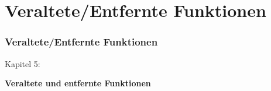 %

\section{Veraltete/Entfernte Funktionen}
\begin{frame}[fragile]
	\frametitle{Veraltete/Entfernte Funktionen}

	\begin{center}\huge{Kapitel 5:}\end{center}
	\begin{center}\huge{\color{typo3darkgrey}\textbf{Veraltete und entfernte Funktionen}}\end{center}

\end{frame}


